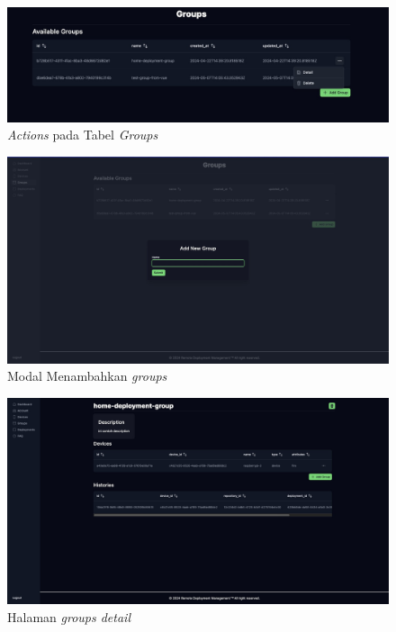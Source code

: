 \begin{figure}[ht]
  \centering
  \includegraphics[width=1\textwidth]{resources/chapter-4/dashboard/groups-page-actions.jpg}
  \caption{\textit{Actions} pada Tabel \textit{Groups}}
  \label{fig:halaman-groups-actions}
\end{figure}

\begin{figure}[ht]
  \centering
  \includegraphics[width=1\textwidth]{resources/chapter-4/dashboard/groups-page-add.jpg}
  \caption{Modal Menambahkan \textit{groups}}
  \label{fig:halaman-groups-add}
\end{figure}

\begin{figure}[ht]
  \centering
  \includegraphics[width=1\textwidth]{resources/chapter-4/dashboard/groups-detail-page.jpg}
  \caption{Halaman \textit{groups detail}}
  \label{fig:halaman-groups-detail}
\end{figure}


